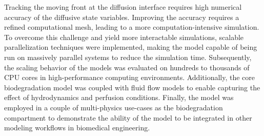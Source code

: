 Tracking the moving front at the diffusion interface requires high numerical accuracy of the diffusive state variables. Improving the accuracy requires a refined computational mesh, leading to a more computation-intensive simulation. To overcome this challenge and yield more interactable simulations, scalable parallelization techniques were implemented, making the model capable of being run on massively parallel systems to reduce the simulation time. Subsequently, the scaling behavior of the models was evaluated on hundreds to thousands of CPU cores in high-performance computing environments. Additionally, the core biodegradation model was coupled with fluid flow models to enable capturing the effect of hydrodynamics and perfusion conditions. Finally, the model was employed in a couple of multi-physics use-cases as the biodegradation compartment to demonstrate the ability of the model to be integrated in other modeling workflows in biomedical engineering.

\cleardoublepage

